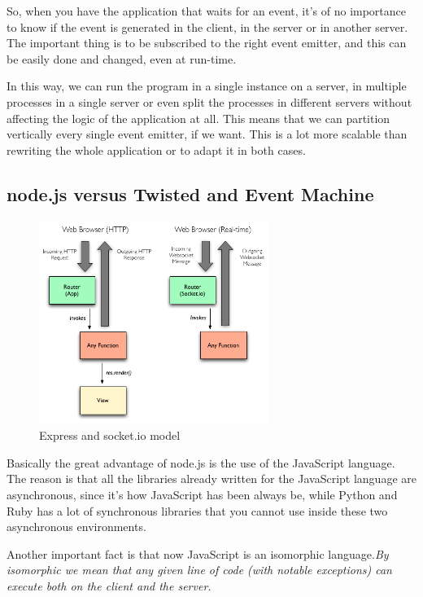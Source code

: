 So, when you have the application that waits for an event, it's of no importance to know if the event is generated in the client, in the server or in another server. The important thing is to be subscribed to the right event emitter, and this can be easily done and changed, even at run-time.

In this way, we can run the program in a single instance on a server, in multiple processes in a single server or even split the processes in different servers without affecting the logic of the application at all. This means that we can partition vertically every single event emitter, if we want. This is a lot more scalable than rewriting the whole application or to adapt it in both cases.

\subsection{node.js versus Twisted and Event Machine}

\begin{figure}[H]
\centering %
\includegraphics[height=250px]{img/express.png}
\caption{Express and socket.io model}
\label{fig:expressSocketio}
\end{figure}

Basically the great advantage of node.js is the use of the JavaScript language. The reason is that all the libraries already written for the JavaScript language are asynchronous, since it's how JavaScript has been always be, while Python and Ruby has a lot of synchronous libraries that you cannot use inside these two asynchronous environments.

Another important fact is that now JavaScript is an isomorphic language.\textit{By isomorphic we mean that any given line of code (with notable exceptions) can execute both on the client and the server.}\cite{website:isomorfic}

